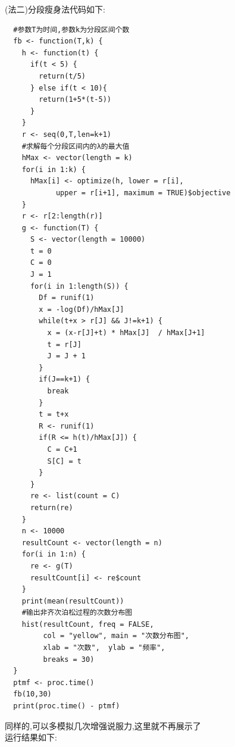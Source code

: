 \documentclass{book}
\begin{document}
\noindent
(法二)分段瘦身法代码如下:
\lstset{language = R}
\begin{lstlisting}
  #参数T为时间,参数k为分段区间个数
  fb <- function(T,k) {
    h <- function(t) {
      if(t < 5) {
        return(t/5)
      } else if(t < 10){
        return(1+5*(t-5))
      }
    }
    r <- seq(0,T,len=k+1)
    #求解每个分段区间内的λ的最大值
    hMax <- vector(length = k)
    for(i in 1:k) {
      hMax[i] <- optimize(h, lower = r[i],
            upper = r[i+1], maximum = TRUE)$objective
    }
    r <- r[2:length(r)]
    g <- function(T) {
      S <- vector(length = 10000)
      t = 0
      C = 0
      J = 1
      for(i in 1:length(S)) {
        Df = runif(1)
        x = -log(Df)/hMax[J] 
        while(t+x > r[J] && J!=k+1) {
          x = (x-r[J]+t) * hMax[J]  / hMax[J+1] 
          t = r[J]
          J = J + 1
        }
        if(J==k+1) {
          break
        } 
        t = t+x
        R <- runif(1)
        if(R <= h(t)/hMax[J]) {
          C = C+1
          S[C] = t
        }
      }
      re <- list(count = C)
      return(re)
    }
    n <- 10000
    resultCount <- vector(length = n)
    for(i in 1:n) {
      re <- g(T)
      resultCount[i] <- re$count 
    }
    print(mean(resultCount))
    #输出非齐次泊松过程的次数分布图
    hist(resultCount, freq = FALSE,
         col = "yellow", main = "次数分布图",
         xlab = "次数",  ylab = "频率",
         breaks = 30)
  }
  ptmf <- proc.time()
  fb(10,30)
  print(proc.time() - ptmf)
\end{lstlisting}
\noindent
同样的,可以多模拟几次增强说服力,这里就不再展示了\\
运行结果如下:
\begin{figure}[H]
\end{figure}
\end{document}
